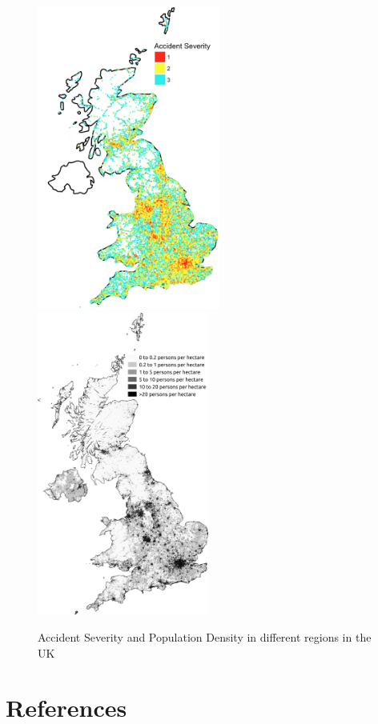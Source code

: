 \documentclass{neu_handout}
\begin{document}
\begin{figure}[!htb]
  \includegraphics[height=10cm,width=0.8\linewidth]{accident-severity.png}
\endminipage\hfill
{}
  \includegraphics[height=10cm,width=0.8\linewidth]{population-density.png}
  \endminipage
\caption{Accident Severity and Population Density in different regions in the UK}  
\end{figure}

\section{References}
\end{document}
